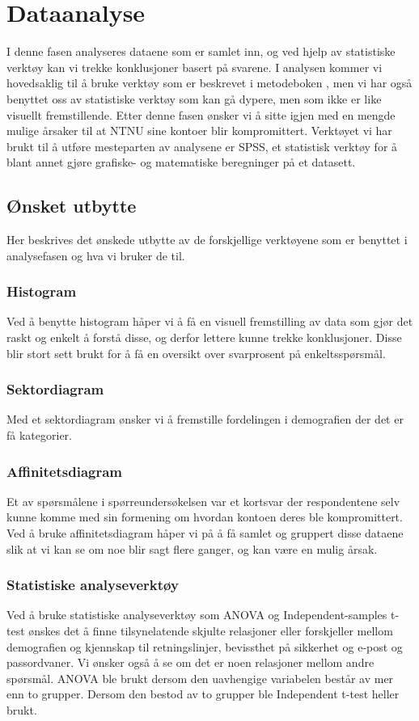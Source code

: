\chapter{Dataanalyse}
I denne fasen analyseres dataene som er samlet inn, og ved hjelp av statistiske verktøy kan vi trekke konklusjoner basert på svarene. I analysen kommer vi hovedsaklig til å bruke verktøy som er beskrevet i metodeboken \cite{RCA}, men vi har også benyttet oss av statistiske verktøy som kan gå dypere, men som ikke er like visuellt fremstillende. Etter denne fasen ønsker vi å sitte igjen med en mengde mulige årsaker til at NTNU sine kontoer blir kompromittert. Verktøyet vi har brukt til å utføre mesteparten av analysene er SPSS, et statistisk verktøy for å blant annet gjøre grafiske- og matematiske beregninger på et datasett.

\section{Ønsket utbytte}
Her beskrives det ønskede utbytte av de forskjellige verktøyene som er benyttet i analysefasen og hva vi bruker de til.

\subsection{Histogram}
Ved å benytte histogram håper vi å få en visuell fremstilling av data som gjør det raskt og enkelt å forstå disse, og derfor lettere kunne trekke konklusjoner. Disse blir stort sett brukt for å få en oversikt over svarprosent på enkeltsspørsmål. 

\subsection{Sektordiagram}
Med et sektordiagram ønsker vi å fremstille fordelingen i demografien der det er få kategorier. 

\subsection{Affinitetsdiagram}
Et av spørsmålene i spørreundersøkelsen var et kortsvar der respondentene selv kunne komme med sin formening om hvordan kontoen deres ble kompromittert. Ved å bruke affinitetsdiagram håper vi på å få samlet og gruppert disse dataene slik at vi kan se om noe blir sagt flere ganger, og kan være en mulig årsak. 

\subsection{Statistiske analyseverktøy}
Ved å bruke statistiske analyseverktøy som ANOVA og Independent-samples t-test ønskes det å finne tilsynelatende skjulte relasjoner eller forskjeller mellom demografien og kjennskap til retningslinjer, bevissthet på sikkerhet og e-post og passordvaner. Vi ønsker også å se om det er noen relasjoner mellom andre spørsmål. ANOVA ble brukt dersom den uavhengige variabelen består av mer enn to grupper. Dersom den bestod av to grupper ble Independent t-test heller brukt.

